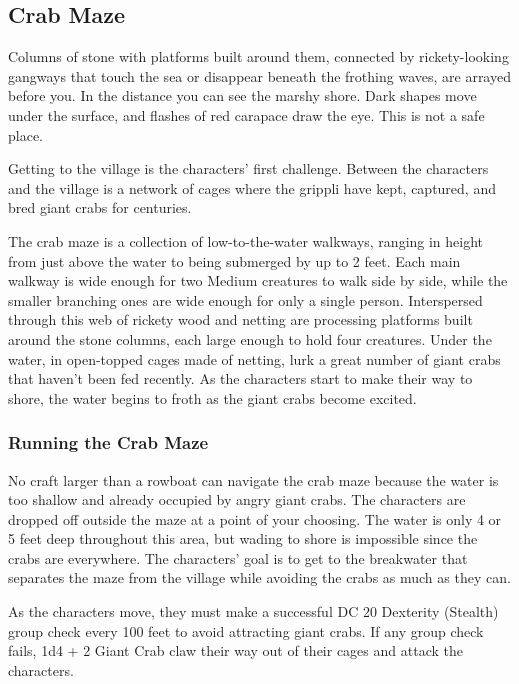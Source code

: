 \documentclass[10pt,a4paper,twoside,bg=print,twocolumn,openany,nodeprecatedcode]{dndbook}
\begin{document}
\subsection{Crab Maze}
\begin{DndReadAloud}{}
Columns of stone with platforms built around them, connected by rickety-looking gangways that touch the sea or disappear beneath the frothing waves, are arrayed before you. In the distance you can see the marshy shore. Dark shapes move under the surface, and flashes of red carapace draw the eye. This is not a safe place.

\end{DndReadAloud}

Getting to the village is the characters' first challenge. Between the characters and the village is a network of cages where the grippli have kept, captured, and bred giant crabs for centuries.

The crab maze is a collection of low-to-the-water walkways, ranging in height from just above the water to being submerged by up to 2 feet. Each main walkway is wide enough for two Medium creatures to walk side by side, while the smaller branching ones are wide enough for only a single person. Interspersed through this web of rickety wood and netting are processing platforms built around the stone columns, each large enough to hold four creatures. Under the water, in open-topped cages made of netting, lurk a great number of giant crabs that haven't been fed recently. As the characters start to make their way to shore, the water begins to froth as the giant crabs become excited.

\subsubsection{Running the Crab Maze}
No craft larger than a rowboat can navigate the crab maze because the water is too shallow and already occupied by angry giant crabs. The characters are dropped off outside the maze at a point of your choosing. The water is only 4 or 5 feet deep throughout this area, but wading to shore is impossible since the crabs are everywhere. The characters' goal is to get to the breakwater that separates the maze from the village while avoiding the crabs as much as they can.

As the characters move, they must make a successful DC 20 Dexterity (Stealth) group check every 100 feet to avoid attracting giant crabs. If any group check fails, 1d4 + 2 Giant Crab claw their way out of their cages and attack the characters.
\end{document}
